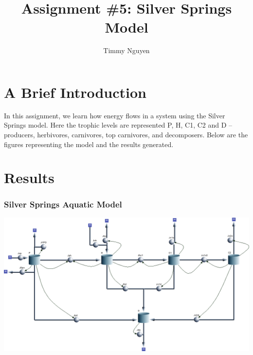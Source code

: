 \documentclass [12pt] {article}
\title{\vspace{-2cm}Assignment \#5: Silver Springs Model}
\author{Timmy Nguyen}
\begin{document}
\maketitle
\section{A Brief Introduction}
In this assignment, we learn how energy flows in a system using the Silver Springs model. Here the trophic levels are represented P, H, C1, C2 and D -- producers, herbivores, carnivores, top carnivores, and decomposers. Below are the figures representing the model and the results generated.
\section{Results}

\subsubsection{Silver Springs Aquatic Model}
\includegraphics[scale=0.4]{silver_spring_model.png} \\
\newpage
\end{document}
